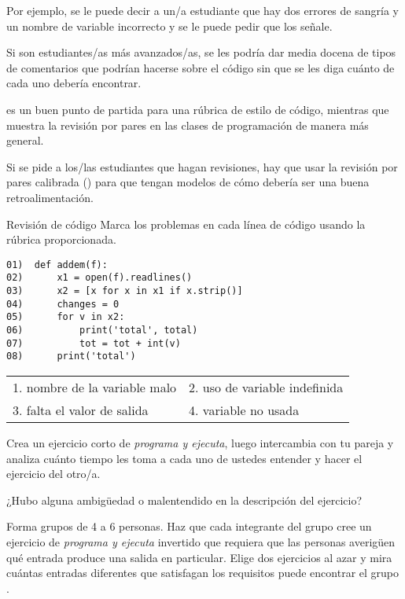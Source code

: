 Por ejemplo, 
se le puede decir a un/a estudiante que hay dos errores de sangría y un nombre de variable incorrecto y se le puede pedir que los señale.

Si son estudiantes/as más avanzados/as, se les podría dar media docena de tipos de comentarios que podrían hacerse sobre el código sin que se les diga cuánto de cada uno debería encontrar.

\cite{Steg2016b} es un buen punto de partida para una rúbrica de estilo de código, mientras que~\cite{Luxt2009} muestra la revisión por pares en las clases de programación de manera más general.

Si se pide a los/las estudiantes que hagan revisiones, hay que usar la revisión por pares calibrada () para que tengan modelos de cómo debería ser una buena retroalimentación.

\begin{aside}{Revisión de código}
 Marca los problemas en cada línea de código usando la rúbrica proporcionada.

\begin{verbatim}
01)  def addem(f):
02)      x1 = open(f).readlines()
03)      x2 = [x for x in x1 if x.strip()]
04)      changes = 0
05)      for v in x2:
06)          print('total', total)
07)          tot = tot + int(v)
08)      print('total')
\end{verbatim}

   \begin{longtable}{ll}
    1. nombre de la variable malo   & 2. uso de variable indefinida \\
    3. falta el valor de salida & 4. variable no usada
  \end{longtable}

\end{aside}



Crea un ejercicio corto de \emph{programa y ejecuta}, 
luego intercambia con tu pareja 
y analiza cuánto tiempo les toma a cada uno de ustedes entender y hacer el ejercicio del otro/a.

¿Hubo alguna ambigüedad o malentendido en la descripción del ejercicio?


Forma grupos de 4 a 6 personas.
Haz que cada integrante del grupo cree un ejercicio de \emph{programa y ejecuta} invertido que requiera que las personas averigüen qué entrada produce una salida en particular.
Elige dos ejercicios al azar 
y mira cuántas entradas diferentes que satisfagan los requisitos puede encontrar el grupo .

